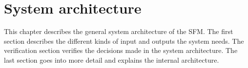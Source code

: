 \chapter{System architecture}
\label{ch:system}
This chapter describes the general system architecture of the SFM. The first section describes the different kinds of input and outputs the system needs. The verification section verifies the decisions made in the system architecture. The last section goes into more detail and explains the internal architecture. 





